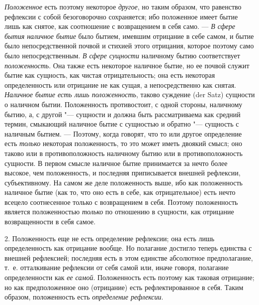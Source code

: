 {\em Положенное} есть поэтому некоторое
{\em другое}, но таким образом, что равенство рефлексии
с собой безоговорочно сохраняется; ибо положенное имеет бытие лишь как
снятое, как соотношение с возвращением в себя само. ---
{\em В сфере бытия наличное бытие }было бытием, имевшим
отрицание в себе самом, и бытие было непосредственной почвой и стихией
этого отрицания, которое поэтому само было непосредственным.
{\em В сфере сущности} наличному бытию соответствует
{\em положенность}. Она также есть некоторое наличное
бытие, но ее почвой служит бытие как сущность, как чистая отрицательность;
она есть некоторая определенность или отрицание не как сущая, а
непосредственно как снятая. {\em Наличное бытие есть
лишь положенность}, таково суждение (der Satz) сущности о наличном бытии.
Положенность противостоит, с одной стороны, наличному бытию, а, с другой
"--- сущности и должна быть рассматриваема как средний термин, смыкающий
наличное бытие с сущностью и обратно "--- сущность с наличным бытием. ---
Поэтому, когда говорят, что то или другое определение есть
{\em только} некоторая положенность, то это может иметь
двоякий смысл; оно таково или в противоположность наличному бытию или в
противоположность сущности. В первом смысле наличное бытие принимается за
нечто более высокое, чем положенность, и последняя приписывается внешней
рефлексии, субъективному. На самом же деле положенность выше, ибо как
положенность наличное бытие (как то, что оно есть в себе, как
отрицательное) есть нечто всецело соотнесенное только с возвращением в
себя. Поэтому положенность является положенностью
{\em только} по отношению в сущности, как отрицание
возвращенности в себя самое.

2. Положенность еще не есть определение рефлексии; она есть лишь
определенность как отрицание вообще. Но полагание достигло теперь единства
с внешней рефлексией; последняя есть в этом единстве абсолютное
предполагание, т.~е. отталкивание рефлексии от себя самой или, иначе
говоря, полагание определенности как {\em ее самой}.
Положенность есть поэтому как таковая отрицание; но как предположенное оно
(отрицание) есть рефлектированное в себя. Таким образом, положенность есть
{\em определение рефлексии}.

